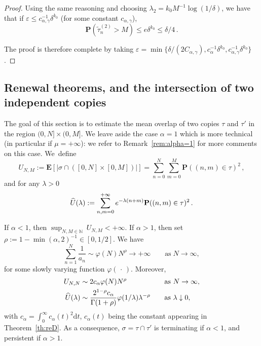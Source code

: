 \documentclass[AHL,Unicode,longabstracts]{cedram}
\newcommand{\ga}{\alpha}
\newcommand{\gd}{\delta}
\newcommand{\gep}{\varepsilon}
\newcommand{\gl}{\lambda}
\newcommand{\dd}{\mathrm{d}}
\renewcommand{\tilde}{\widetilde}
\let\oldhat\hat
\renewcommand*{\hat}[1]{\mathchoice{\widehat{#1}}{\widehat{#1}}{\oldhat{#1}}{\oldhat{#1}}}
\newcommand{\bP}{\ensuremath{\mathbf{P}}}
\newcommand{\bE}{\ensuremath{\mathbf{E}}}
\newcommand{\bbN}{\ensuremath{\mathbb{N}}}
\begin{document}
\begin{appendix}
\begin{proof}
Using the same reasoning and choosing $\lambda_2 = k_0 M^{-1} \log (1/\delta)$, we have that if $\gep\leq c_{\ga,\gamma}^{-1} \gd^{k_0}$ (for some constant $c_{\ga,\gamma}$),
\begin{equation}
\bP(\tilde{\tau}^{(2)}_n > M) \le e \delta^{k_0} \leq \gd/4\,.
\end{equation}

The proof is therefore complete by taking $\gep = \min \lbrace \delta / (2 C_{\ga,\gamma}), c_{\ga}^{-1} \delta^{k_0}, c_{\ga,\gamma}^{-1} \delta^{k_0} \rbrace$.
\end{proof}

\subsection{Renewal theorems, and the intersection of two independent copies}

The goal of this section is to estimate the mean overlap of two copies $\tau$ and $\tau'$ in the region $(0,N]\times (0,M]$. We leave aside the case $\ga=1$ which is more technical (in particular if $\mu=+\infty$): we refer to Remark~\ref{rem:alpha=1} for more comments on this case. We~define
\begin{equation}\label{eq:UNM}
U_{N,M}:= \bE\left[\left| \sigma\cap \left([0,N]\times [0,M]\right) \right|\right] =\sum_{n=0}^{N} \sum_{m=0}^{M} \bP((n,m)\in\tau)^2\,,
\end{equation}
and for any $\gl>0$
\begin{equation}
\hat U (\gl) := \sum_{n,m=0}^{+\infty} e^{-\gl (n+m)} \bP((n,m)\in\tau)^2\,.
\end{equation}

\begin{prop}\label{prop:transience}
If $\ga<1$, then $\sup_{N,M\in\bbN} \ U_{N,M} <+\infty.$ If $\ga>1$, then set $\rho:=1-\min(\ga,2)^{-1} \in [0,1/2]$. We have
\begin{equation}\label{suman}
\sum_{n=1}^N \frac{1}{a_n} \sim \varphi(N) N^{\rho} \to +\infty \qquad \text{as}\;N\to\infty,
\end{equation}
for some slowly varying function $ \varphi ({\,\cdot\,})$. Moreover,
\begin{equation}\label{eq:asympUn}
\begin{aligned}
U_{N,N}&\sim 2 c_{\ga} \varphi(N) N^{\rho} &&\quad \text{as } N\to\infty, \\
\hat U(\gl) & \sim \frac{2^{1-\rho} c_{\ga}}{\Gamma(1+\rho)} \varphi(1/\gl) \gl^{-\rho} &&\quad \text{as } \gl\downarrow 0,
\end{aligned}
\end{equation}
with $c_{\ga} = \int_{0}^{\infty} c_{\ga}(t)^2 \dd t$, $c_{\ga}(t)$ being the constant appearing in Theorem~\ref{th:reD}.
As a consequence, $\sigma=\tau\cap\tau'$ is terminating if $\ga<1$, and persistent if $\ga> 1$.
\end{prop}


\end{appendix}
\end{document}
